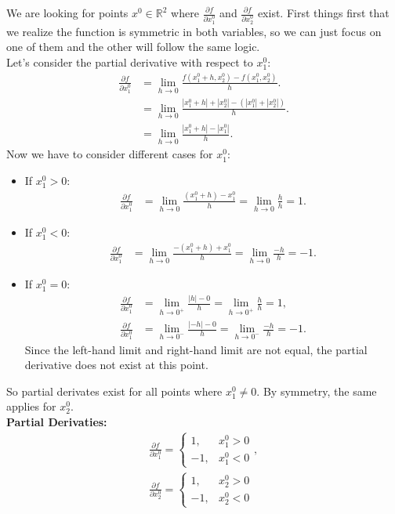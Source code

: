 \documentclass{article}
\begin{document}
We are looking for points \(x^0 \in \mathbb{R}^2\) where \(\frac{\partial f}{\partial x^0_1}\) and \(\frac{\partial f}{\partial x^0_2}\) exist.
First things first that we realize the function is symmetric in both variables, so we can just focus on one of them and the other will follow the same logic. \\
Let's consider the partial derivative with respect to \(x^0_1\):
\begin{align*}
   \frac{\partial f}{\partial x^0_1} &= \lim_{h \to 0} \frac{f(x^0_1 + h, x^0_2) - f(x^0_1, x^0_2)}{h}. \\
   &= \lim_{h \to 0} \frac{|x^0_1 + h| + |x^0_2| - (|x^0_1| + |x^0_2|)}{h}. \\
   &= \lim_{h \to 0} \frac{|x^0_1 + h| - |x^0_1|}{h}.
\end{align*}
Now we have to consider different cases for \(x^0_1\):
\begin{itemize}
   \item If \(x^0_1 > 0\):
   \begin{align*}
      \frac{\partial f}{\partial x^0_1} &= \lim_{h \to 0} \frac{(x^0_1 + h) - x^0_1}{h} = \lim_{h \to 0} \frac{h}{h} = 1.
   \end{align*}
   \item If \(x^0_1 < 0\):
   \begin{align*}
      \frac{\partial f}{\partial x^0_1} &= \lim_{h \to 0} \frac{-(x^0_1 + h) + x^0_1}{h} = \lim_{h \to 0} \frac{-h}{h} = -1.
   \end{align*}
   \item If \(x^0_1 = 0\):
   \begin{align*}
      \frac{\partial f}{\partial x^0_1} &= \lim_{h \to 0^+} \frac{|h| - 0}{h} = \lim_{h \to 0^+} \frac{h}{h} = 1, \\
      \frac{\partial f}{\partial x^0_1} &= \lim_{h \to 0^-} \frac{|-h| - 0}{h} = \lim_{h \to 0^-} \frac{-h}{h} = -1.
   \end{align*}
   Since the left-hand limit and right-hand limit are not equal, the partial derivative does not exist at this point.
\end{itemize}

So partial derivates exist for all points where \(x^0_1 \neq 0\). By symmetry, the same applies for \(x^0_2\). \\
\textbf{Partial Derivaties:}
\begin{align*}
   \frac{\partial f}{\partial x^0_1} =
   \begin{cases}
      1, & x^0_1 > 0 \\
      -1, & x^0_1 < 0
   \end{cases}, \\
   \frac{\partial f}{\partial x^0_2} =
   \begin{cases}
      1, & x^0_2 > 0 \\
      -1, & x^0_2 < 0
   \end{cases}
\end{align*}
\end{document}
